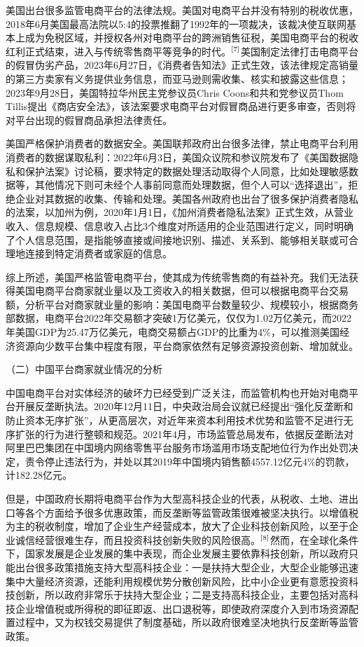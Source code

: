 \documentclass[12pt,twoside,utf8]{ctexart}
\begin{document}
美国出台很多监管电商平台的法律法规。美国对电商平台并没有特别的税收优惠，2018年6月美国最高法院以5:4的投票推翻了1992年的一项裁决，该裁决使互联网基本上成为免税区域，并授权各州对电商平台的跨洲销售征税，美国电商平台的税收红利正式结束，进入与传统零售商平等竞争的时代。$\textsuperscript{[7]}$美国制定法律打击电商平台的假冒伪劣产品，2023年6月27日，《消费者告知法》正式生效，该法律规定高销量的第三方卖家有义务提供业务信息，而亚马逊则需收集、核实和披露这些信息；2023年9月28日，美国特拉华州民主党参议员Chris Coons和共和党参议员Thom Tillis提出《商店安全法》，该法案要求电商平台对假冒商品进行更多审查，否则将对平台出现的假冒商品承担法律责任。

美国严格保护消费者的数据安全。美国联邦政府出台很多法律，禁止电商平台利用消费者的数据谋取私利：2022年6月3日，美国众议院和参议院发布了《美国数据隐私和保护法案》讨论稿，要求特定的数据处理活动取得个人同意，比如处理敏感数据等，其他情况下则可未经个人事前同意而处理数据，但个人可以“选择退出”，拒绝企业对其数据的收集、传输和处理。美国各州政府也出台了很多保护消费者隐私的法案，以加州为例，2020年1月1日，《加州消费者隐私法案》正式生效，从营业收入、信息规模、信息收入占比3个维度对所适用的企业范围进行定义，同时明确了个人信息范围，是指能够直接或间接地识别、描述、关系到、能够相关联或可合理地连接到特定消费者或家庭的信息。

综上所述，美国严格监管电商平台，使其成为传统零售商的有益补充。我们无法获得美国电商平台商家就业量以及工资收入的相关数据，但可以根据电商平台交易额，分析平台对商家就业量的影响：美国电商平台数量较少、规模较小，根据商务部数据，电商平台2022年交易额才突破1万亿美元，仅仅为1.02万亿美元，而2022年美国GDP为25.47万亿美元，电商交易额占GDP的比重为4\%，可以推测美国经济资源向少数平台集中程度有限，平台商家依然有足够资源投资创新、增加就业。

（二）中国平台商家就业情况的分析

中国电商平台对实体经济的破坏力已经受到广泛关注，而监管机构也开始对电商平台开展反垄断执法。2020年12月11日，中央政治局会议就已经提出“强化反垄断和防止资本无序扩张”，从更高层次，对近年来资本利用技术优势和监管不足进行无序扩张的行为进行整顿和规范。2021年4月，市场监管总局发布，依据反垄断法对阿里巴巴集团在中国境内网络零售平台服务市场滥用市场支配地位行为作出处罚决定，责令停止违法行为，并处以其2019年中国境内销售额4557.12亿元4\%的罚款，计182.28亿元。

但是，中国政府长期将电商平台作为大型高科技企业的代表，从税收、土地、进出口等各个方面给予很多优惠政策，而反垄断等监管政策很难被坚决执行。以增值税为主的税收制度，增加了企业生产经营成本，放大了企业科技创新风险，以至于企业诚信经营很难生存，而且投资科技创新失败的风险很高。$\textsuperscript{[8]}$然而，在全球化条件下，国家发展是企业发展的集中表现，而企业发展主要依靠科技创新，所以政府只能出台很多政策措施支持大型高科技企业：一是扶持大型企业，大型企业能够迅速集中大量经济资源，还能利用规模优势分散创新风险，比中小企业更有意愿投资科技创新，所以政府非常乐于扶持大型企业；二是支持高科技企业，主要包括对高科技企业增值税或所得税的即征即返、出口退税等，即使政府深度介入到市场资源配置过程中，又为权钱交易提供了制度基础，所以政府很难坚决地执行反垄断等监管政策。
\end{document}
